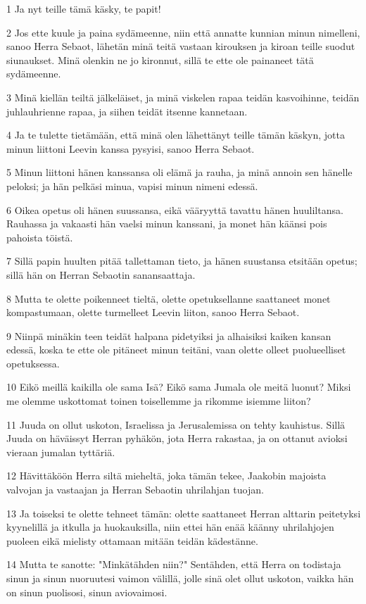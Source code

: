 \par 1 Ja nyt teille tämä käsky, te papit!
\par 2 Jos ette kuule ja paina sydämeenne, niin että annatte kunnian minun nimelleni, sanoo Herra Sebaot, lähetän minä teitä vastaan kirouksen ja kiroan teille suodut siunaukset. Minä olenkin ne jo kironnut, sillä te ette ole painaneet tätä sydämeenne.
\par 3 Minä kiellän teiltä jälkeläiset, ja minä viskelen rapaa teidän kasvoihinne, teidän juhlauhrienne rapaa, ja siihen teidät itsenne kannetaan.
\par 4 Ja te tulette tietämään, että minä olen lähettänyt teille tämän käskyn, jotta minun liittoni Leevin kanssa pysyisi, sanoo Herra Sebaot.
\par 5 Minun liittoni hänen kanssansa oli elämä ja rauha, ja minä annoin sen hänelle peloksi; ja hän pelkäsi minua, vapisi minun nimeni edessä.
\par 6 Oikea opetus oli hänen suussansa, eikä vääryyttä tavattu hänen huuliltansa. Rauhassa ja vakaasti hän vaelsi minun kanssani, ja monet hän käänsi pois pahoista töistä.
\par 7 Sillä papin huulten pitää tallettaman tieto, ja hänen suustansa etsitään opetus; sillä hän on Herran Sebaotin sanansaattaja.
\par 8 Mutta te olette poikenneet tieltä, olette opetuksellanne saattaneet monet kompastumaan, olette turmelleet Leevin liiton, sanoo Herra Sebaot.
\par 9 Niinpä minäkin teen teidät halpana pidetyiksi ja alhaisiksi kaiken kansan edessä, koska te ette ole pitäneet minun teitäni, vaan olette olleet puolueelliset opetuksessa.
\par 10 Eikö meillä kaikilla ole sama Isä? Eikö sama Jumala ole meitä luonut? Miksi me olemme uskottomat toinen toisellemme ja rikomme isiemme liiton?
\par 11 Juuda on ollut uskoton, Israelissa ja Jerusalemissa on tehty kauhistus. Sillä Juuda on häväissyt Herran pyhäkön, jota Herra rakastaa, ja on ottanut avioksi vieraan jumalan tyttäriä.
\par 12 Hävittäköön Herra siltä mieheltä, joka tämän tekee, Jaakobin majoista valvojan ja vastaajan ja Herran Sebaotin uhrilahjan tuojan.
\par 13 Ja toiseksi te olette tehneet tämän: olette saattaneet Herran alttarin peitetyksi kyynelillä ja itkulla ja huokauksilla, niin ettei hän enää käänny uhrilahjojen puoleen eikä mielisty ottamaan mitään teidän kädestänne.
\par 14 Mutta te sanotte: "Minkätähden niin?" Sentähden, että Herra on todistaja sinun ja sinun nuoruutesi vaimon välillä, jolle sinä olet ollut uskoton, vaikka hän on sinun puolisosi, sinun aviovaimosi.
